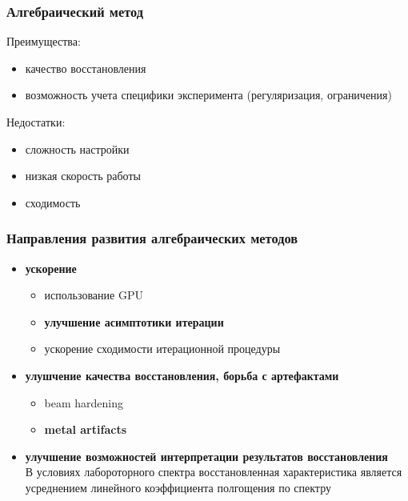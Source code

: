 \begin{frame}
\frametitle{Алгебраический метод}

Преимущества:\\
\begin{itemize}
  \item качество восстановления
  \item возможность учета специфики эксперимента (регуляризация, ограничения)
\end{itemize}
\vspace{2cm}

Недостатки:\\
\begin{itemize}
  \item сложность настройки
  \item низкая скорость работы
  \item сходимость
\end{itemize}
\end{frame}

\begin{frame}
\frametitle{Направления развития алгебраических методов}

\begin{itemize}
  \item \textbf{ускорение}
  \begin{itemize}
    \item использование GPU
    \item \textbf{улучшение асимптотики итерации}
    \item ускорение сходимости итерационной процедуры
  \end{itemize}
  \item \textbf{улушчение качества восстановления, борьба с артефактами}
    \begin{itemize}
    \item beam hardening
    \item \textbf{metal artifacts}
    \end{itemize}
  \item \textbf{улучшение возможностей интерпретации результатов восстановления}\\
  \small{В условиях лабороторного спектра восстановленная характеристика является усреднением линейного коэффициента полгощения по спектру}
\end{itemize}

\end{frame}